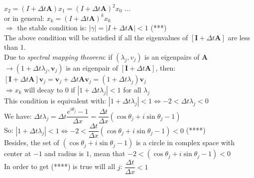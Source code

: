 \documentclass[14pt,a4paper]{article}
\begin{document}
\begin{enumerate}
	\hspace*{5.7cm} $x_2 = (I + \Delta t\textbf{A})x_1 = (I + \Delta t\textbf{A})^2x_0$ ...\\
	\hspace*{2.5cm} or in general: \hspace{0.5cm}  $x_k = (I + \Delta t\textbf{A})^kx_0$\\
	$\Rightarrow$ the stable condition is: $|\gamma| = \left| I + \Delta t\textbf{A}\right| < 1$ \hspace{5cm} (***)\\
	The above condition will be satisfied if all the eigenvalues of $[\textbf{I} + \Delta t\textbf{A}]$ are less than 1.\\
	Due to \textit{spectral mapping theorem}: if $(\lambda_j,v_j)$ is an eigenpairs of \textbf{A} $\rightarrow (1 + \Delta t\lambda_j,\textbf{v}_j)$ is an eigenpair of $[\textbf{I} + \Delta t\textbf{A}]$, then:\\
	\hspace*{3cm} $[\textbf{I} + \Delta t\textbf{A}]\textbf{v}_j = \textbf{v}_j + \Delta t\textbf{Av}_j = (1 +\Delta t\lambda_j)\textbf{v}_j$\\
	$\Rightarrow x_k$ will decay to 0 if $|1+\Delta t\lambda_j| < 1$ for all $\lambda_j$\\
	This condition is equivalent with: $|1+\Delta t\lambda_j| < 1 \Leftrightarrow -2 < \Delta t\lambda_j < 0$\\
	We have: $\Delta t\lambda_j = \Delta t \dfrac{e^{i\theta_j}-1}{\Delta x} = \dfrac{\Delta t}{\Delta x}(\cos\theta_j + i\sin\theta_j -1)$\\
	So: $|1+\Delta t\lambda_j| < 1 \Leftrightarrow -2 < \dfrac{\Delta t}{\Delta x}(\cos\theta_j + i\sin\theta_j -1) < 0$ \hspace{5cm} (****)\\
	Besides, the set of $(\cos\theta_j + i\sin\theta_j -1)$ is a circle in complex space with center at $-1$ and radius is $1$, mean that $-2 < (\cos\theta_j + i\sin\theta_j -1) < 0$\\
	In order to get (****) is true will all $j$: $\dfrac{\Delta t}{\Delta x} < 1$\\
	

\end{enumerate}
\end{document}
